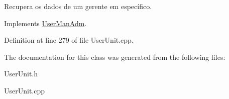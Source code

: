 Recupera os dados de um gerente em específico. 



Implements \hyperlink{classUserManAdm_a62e826d1c11061df021016e94e88f9ba}{User\-Man\-Adm}.



Definition at line 279 of file User\-Unit.\-cpp.



The documentation for this class was generated from the following files\-:\begin{DoxyCompactItemize}
\item 
User\-Unit.\-h\item 
User\-Unit.\-cpp\end{DoxyCompactItemize}
